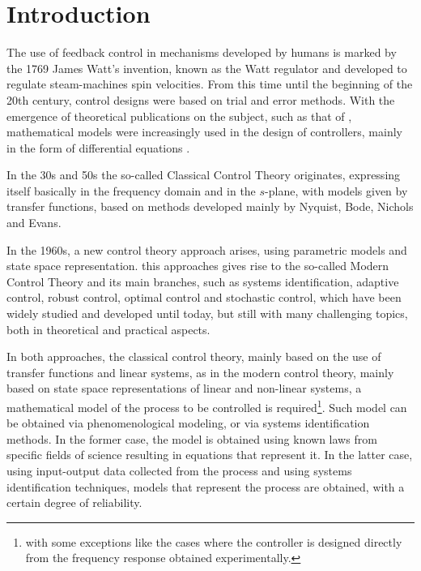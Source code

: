 

\chapter{Introduction}\label{cap1}
\vspace{-1cm}

%

The use of feedback control in mechanisms developed by humans is marked by the 1769 James Watt's invention, known as the Watt regulator and developed to regulate steam-machines spin velocities.
From this time until the beginning of the 20th century, control designs were based on trial and error methods. With the emergence of theoretical publications on the subject, such as that of \citep{tolle1921}, mathematical models were increasingly used in the design of controllers, mainly in the form of differential equations \citep{takahashi1972}.

In the 30s and 50s the so-called Classical Control Theory originates, expressing itself basically in the frequency domain and in the $s$-plane, with models given by transfer functions, based on methods developed mainly by Nyquist, Bode, Nichols and Evans.

In the 1960s, a new control theory approach arises, using parametric models and state space representation. this approaches gives rise to the so-called Modern Control Theory and its main branches, such as systems identification, adaptive control, robust control, optimal control and stochastic control, which have been widely studied and developed until today, but still with many challenging topics, both in theoretical and practical aspects. %

In both approaches, the classical control theory, mainly based on the use of transfer functions and linear systems, as in the modern control theory, mainly based on state space representations of linear and non-linear systems, a mathematical model of the process to be controlled is required\footnote{with some exceptions like the cases where the controller is designed directly from the frequency response obtained experimentally.}.
Such model can be obtained via phenomenological modeling, or via systems identification methods. In the former case, the model is obtained using known laws from specific fields of science resulting in equations that represent it. In the latter case, using input-output data collected from the process and using systems identification techniques, models that represent the process are obtained, with a certain degree of reliability.

